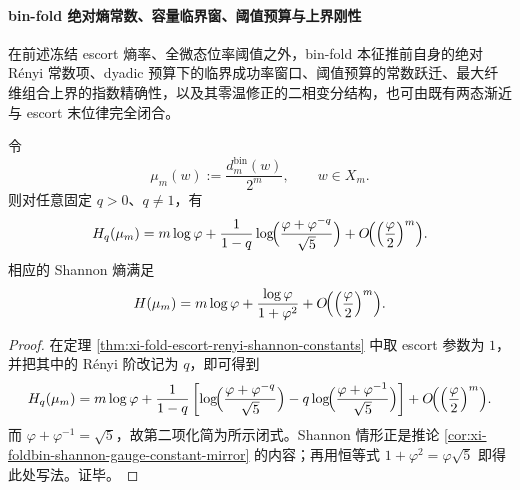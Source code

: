 \paragraph{bin-fold 绝对熵常数、容量临界窗、阈值预算与上界刚性}
在前述冻结 escort 熵率、全微态位率阈值之外，bin-fold 本征推前自身的绝对 Rényi 常数项、dyadic 预算下的临界成功率窗口、阈值预算的常数跃迁、最大纤维组合上界的指数精确性，以及其零温修正的二相变分结构，也可由既有两态渐近与 escort 末位律完全闭合。

\begin{theorem}\label{thm:xi-foldbin-absolute-renyi-entropy-constant-closed}
令
\[
\mu_m(w):=\frac{d_m^{\mathrm{bin}}(w)}{2^m},
\qquad
w\in X_m.
\]
则对任意固定 \(q>0\)、\(q\neq 1\)，有
\[
H_q(\mu_m)
=
m\log\varphi
+
\frac{1}{1-q}\log\!\Bigl(\frac{\varphi+\varphi^{-q}}{\sqrt5}\Bigr)
+
O\!\Bigl(\Bigl(\frac{\varphi}{2}\Bigr)^m\Bigr).
\]
相应的 Shannon 熵满足
\[
H(\mu_m)
=
m\log\varphi
+
\frac{\log\varphi}{1+\varphi^2}
+
O\!\Bigl(\Bigl(\frac{\varphi}{2}\Bigr)^m\Bigr).
\]
\end{theorem}
\begin{proof}
在定理 \ref{thm:xi-fold-escort-renyi-shannon-constants} 中取 escort 参数为 \(1\)，并把其中的 Rényi 阶改记为 \(q\)，即可得到
\[
H_q(\mu_m)
=
m\log\varphi
+
\frac{1}{1-q}\left[
\log\!\Bigl(\frac{\varphi+\varphi^{-q}}{\sqrt5}\Bigr)
-q\log\!\Bigl(\frac{\varphi+\varphi^{-1}}{\sqrt5}\Bigr)
\right]
+
O\!\Bigl(\Bigl(\frac{\varphi}{2}\Bigr)^m\Bigr).
\]
而 \(\varphi+\varphi^{-1}=\sqrt5\)，故第二项化简为所示闭式。Shannon 情形正是推论 \ref{cor:xi-foldbin-shannon-gauge-constant-mirror} 的内容；再用恒等式 \(1+\varphi^2=\varphi\sqrt5\) 即得此处写法。证毕。
\end{proof}


